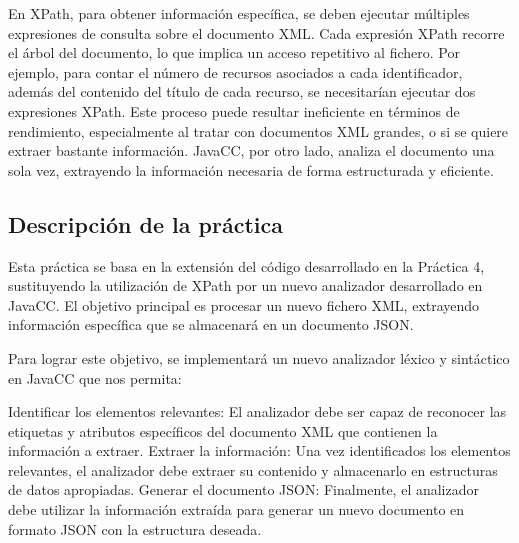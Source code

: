 
En XPath, para obtener información específica, se deben ejecutar múltiples expresiones de consulta sobre el documento XML. Cada expresión XPath recorre el árbol del documento, lo que implica un acceso repetitivo al fichero. Por ejemplo, para contar el número de recursos asociados a cada identificador, además del contenido del título de cada recurso, se necesitarían ejecutar dos expresiones XPath. Este proceso puede resultar ineficiente en términos de rendimiento, especialmente al tratar con documentos XML grandes, o si se quiere extraer bastante información. JavaCC, por otro lado, analiza el documento una sola vez, extrayendo la información necesaria de forma estructurada y eficiente.

\subsection{Descripción de la práctica}

\noindent Esta práctica se basa en la extensión del código desarrollado en la Práctica 4, sustituyendo la utilización de XPath por un nuevo analizador desarrollado en JavaCC. El objetivo principal es procesar un nuevo fichero XML, extrayendo información específica que se almacenará en un documento JSON.

Para lograr este objetivo, se implementará un nuevo analizador léxico y sintáctico en JavaCC que nos permita:

Identificar los elementos relevantes: El analizador debe ser capaz de reconocer las etiquetas y atributos específicos del documento XML que contienen la información a extraer.
Extraer la información: Una vez identificados los elementos relevantes, el analizador debe extraer su contenido y almacenarlo en estructuras de datos apropiadas.
Generar el documento JSON: Finalmente, el analizador debe utilizar la información extraída para generar un nuevo documento en formato JSON con la estructura deseada.


